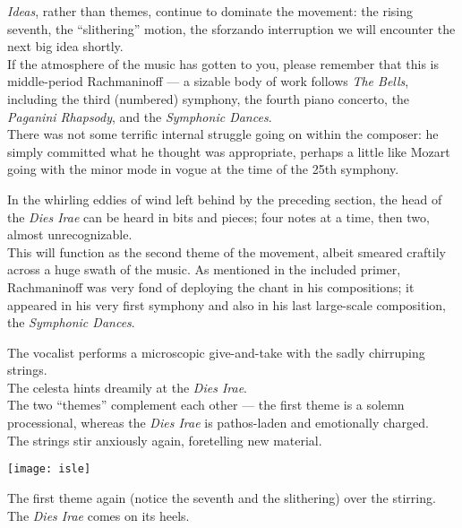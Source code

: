 \documentclass{beamer}
\begin{document}
\begin{frame} 
  \emph{Ideas}, rather than themes, continue to dominate the movement: the rising seventh, the ``slithering'' motion, the sforzando interruption \textellipsis we will encounter the next big idea shortly. 
  \pause \\ 
  If the atmosphere of the music has gotten to you, please remember that this is middle-period Rachmaninoff --- a sizable body of work follows \textit{The Bells}, including the third (numbered) symphony, the fourth piano concerto, the \textit{Paganini Rhapsody}, and the \textit{Symphonic Dances}. 
  \pause \\ 
  There was not some terrific internal struggle going on within the composer: he simply committed what he thought was appropriate, perhaps a little like Mozart going with the minor mode in vogue at the time of the 25th symphony. 
\end{frame} 

\begin{frame}
  In the whirling eddies of wind left behind by the preceding section, the head of the \textit{Dies Irae} can be heard in bits and pieces; \pause four notes at a time, \pause then two, almost unrecognizable. 
  \pause \\
  This will function as the second theme of the movement, albeit smeared craftily across a huge swath of the music. As mentioned in the included primer, Rachmaninoff was very fond of deploying the chant in his compositions; it appeared in his very first symphony and also in his last large-scale composition, the \textit{Symphonic Dances}. 
\end{frame} 

\begin{frame} 
  The vocalist performs a microscopic give-and-take with the sadly chirruping strings. 
  \pause \\ 
  The celesta hints dreamily at the \textit{Dies Irae}. 
  \pause \\ 
  The two ``themes'' complement each other --- the first theme is a solemn processional, whereas the \textit{Dies Irae} is pathos-laden and emotionally charged. 
  \pause \\ 
  The strings stir anxiously again, foretelling new material. 
\end{frame} 

\begin{frame} 
  \begin{center} 
    \texttt{[image: isle]} 
  \end{center} 
  The first theme again (notice the seventh and the slithering) over the stirring. 
  \pause \\
  The \textit{Dies Irae} comes on its heels. 
\end{frame} 
\end{document}
